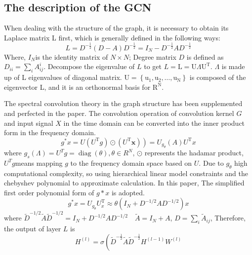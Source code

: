 \documentclass[journal,article,submit,moreauthors,pdftex]{Definitions/mdpi}
\begin{document}
\subsection{The description of the GCN} 
When dealing with the structure of the graph, it is necessary to obtain its Laplace matrix L first, which is generally defined in the following ways:
\begin{equation}
    L=D^{-\frac{1}{2}}(D-A) D^{-\frac{1}{2}}=I_{N}-D^{-\frac{1}{2}} A D^{-\frac{1}{2}}
\end{equation}
Where, $I_{N}$is the identity matrix of $N×N$; Degree matrix $D$ is defined as $D_{i i}=\sum_{i} A_{i j}^{i}$. Decompose the eigenvalue of $L$ to get $L = \mathrm{L}=\mathrm{U} \Lambda \mathrm{U}^{\mathrm{T}}$. $\Lambda$ is made up of L eigenvalues of diagonal matrix. $\mathrm{U}=\left\{\mathrm{u}_{1}, \mathrm{u}_{2}, \ldots, \mathrm{u}_{\mathrm{N}}\right\}$ is composed of the eigenvector L, and it is an orthonormal basis for $\mathrm{R}^{\mathrm{N}}$.
\par The spectral convolution theory in the graph structure has been supplemented and perfected in the paper. The convolution operation of convolution kernel $G$ and input signal $X$ in the time domain can be converted into the inner product form in the frequency domain.
\begin{equation}
    \left.g^{*} x=U\left(U^{\mathrm{T}} g\right) \odot\left(U^{\mathrm{T}} \boldsymbol{x}\right)\right)=U_{g_{\theta}}(A) U^{\mathrm{T}} x
\end{equation}
where $g_{s}(\Lambda)=U^{T} g=\operatorname{diag}(\theta), \theta \in R^{N}$, $\odot$ represents the hadamar product, $U^{T}g$means mapping $g$ to the frequency domain space based on $U$. Due to $g_{\theta}$ high computational complexity, so using hierarchical linear model constraints and the chebyshev polynomial to approximate calculation. In this paper, The simplified first order polynomial form of $g*x$ is adopted.
\begin{equation}
    g^{*} x=U_{g_{\theta}} U_{x}^{\mathrm{T}} \approx \theta\left(I_{N}+D^{-1 / 2} A D^{-1 / 2}\right) x
\end{equation}
where $\widetilde{D}^{-1 / 2} \widetilde{A} \widetilde{D}^{-1 / 2}=I_{N}+D^{-1 / 2} A D^{-1 / 2} \quad \tilde{A}=I_{N}+A $, ${D}=\sum_{i} \widetilde{A}_{i j}$, Therefore, the output of layer $L$ is
\begin{equation}
    H^{(l)}=\sigma\left(\widetilde{D}^{-\frac{1}{2}} \widetilde{A} \widetilde{D}^{-\frac{1}{2}} H^{(l-1)} W^{(l)}\right.
\end{equation}
\end{document}
